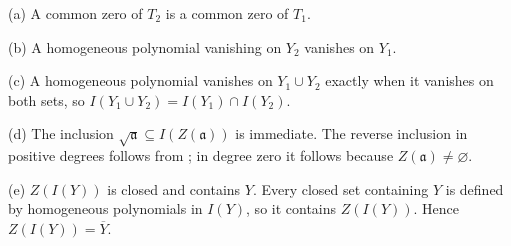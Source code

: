 (a) A common zero of $T_2$ is a common zero of $T_1$.

(b) A homogeneous polynomial vanishing on $Y_2$ vanishes on $Y_1$.

(c) A homogeneous polynomial vanishes on $Y_1\cup Y_2$ exactly when it vanishes on both sets, so $I(Y_1\cup Y_2)=I(Y_1)\cap I(Y_2)$.

(d) The inclusion $\sqrt{\mathfrak a}\subseteq I(Z(\mathfrak a))$ is immediate. The reverse inclusion in positive degrees follows from ; in degree zero it follows because $Z(\mathfrak a)\ne\varnothing$.

(e) $Z(I(Y))$ is closed and contains $Y$. Every closed set containing $Y$ is defined by homogeneous polynomials in $I(Y)$, so it contains $Z(I(Y))$. Hence $Z(I(Y))=\overline Y$.
